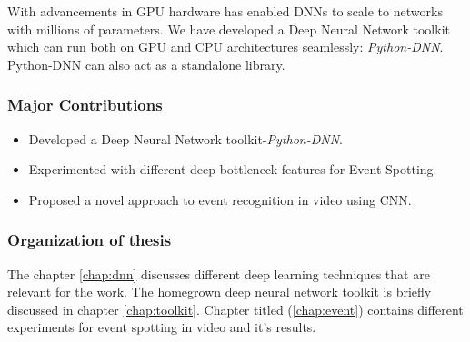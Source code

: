 With advancements in GPU hardware has enabled DNNs to scale to networks with millions of parameters. We have developed a Deep Neural Network toolkit which can run both on GPU and CPU architectures seamlessly: \textit{Python-DNN}. Python-DNN can also act as a standalone library.

\subsubsection{Major Contributions}
\begin{itemize}
\item Developed a Deep Neural Network toolkit-\textit{Python-DNN}. 
\item Experimented with different deep bottleneck features for Event Spotting.
\item Proposed a novel approach to event recognition in video using CNN.
\end{itemize}

\subsubsection{Organization of thesis}
The chapter \ref{chap:dnn} discusses different deep learning techniques that are relevant for the work. The homegrown deep neural network toolkit is briefly discussed in chapter \ref{chap:toolkit}. Chapter titled  (\ref{chap:event}) contains different experiments for event spotting in video and it's results.
